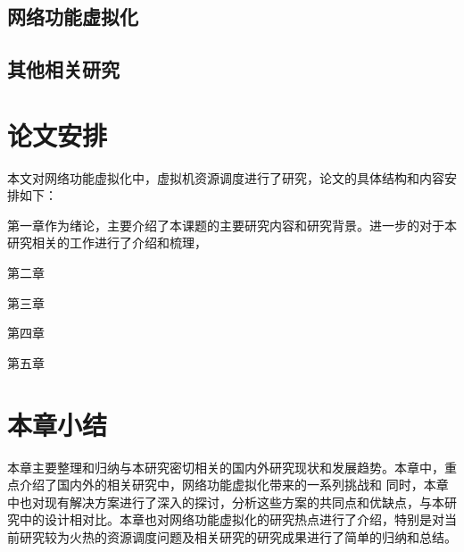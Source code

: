 \subsection{网络功能虚拟化}

\subsection{其他相关研究}

\section{论文安排}
本文对网络功能虚拟化中，虚拟机资源调度进行了研究，论文的具体结构和内容安排如下：

第一章作为绪论，主要介绍了本课题的主要研究内容和研究背景。进一步的对于本研究相关的工作进行了介绍和梳理，

第二章

第三章

第四章

第五章

\section{本章小结}
本章主要整理和归纳与本研究密切相关的国内外研究现状和发展趋势。本章中，重点介绍了国内外的相关研究中，网络功能虚拟化带来的一系列挑战和  同时，本章中也对现有解决方案进行了深入的探讨，分析这些方案的共同点和优缺点，与本研究中的设计相对比。本章也对网络功能虚拟化的研究热点进行了介绍，特别是对当前研究较为火热的资源调度问题及相关研究的研究成果进行了简单的归纳和总结。